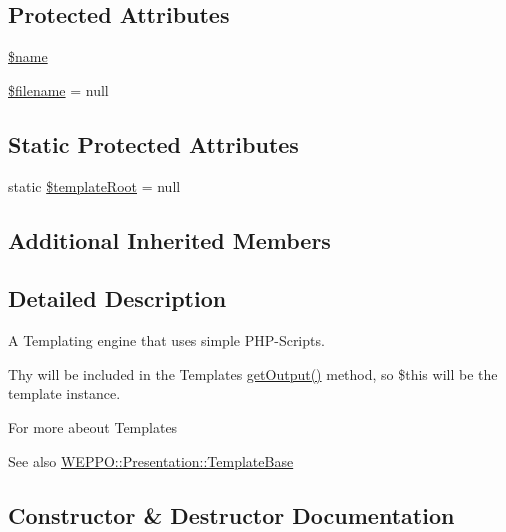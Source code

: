 \subsection*{Protected Attributes}
\begin{DoxyCompactItemize}
\item 
\hyperlink{classWEPPO_1_1Presentation_1_1PHPFileTemplate_a167680b0ee6c9bd8a67655ab9f65fa2a}{\$name}
\item 
\hyperlink{classWEPPO_1_1Presentation_1_1PHPFileTemplate_a2277c9a0683795bb748b30a55293c668}{\$filename} = null
\end{DoxyCompactItemize}
\subsection*{Static Protected Attributes}
\begin{DoxyCompactItemize}
\item 
static \hyperlink{classWEPPO_1_1Presentation_1_1PHPFileTemplate_a02b49f31783cc5edff15e260801a5a3b}{\$template\+Root} = null
\end{DoxyCompactItemize}
\subsection*{Additional Inherited Members}


\subsection{Detailed Description}
A Templating engine that uses simple P\+H\+P-\/\+Scripts.

Thy will be included in the Templates \hyperlink{classWEPPO_1_1Presentation_1_1PHPFileTemplate_a1449e358540d953e2b4e95d4b0f5e1a7}{get\+Output()} method, so \$this will be the template instance.

For more abeout Templates \begin{DoxySeeAlso}{See also}
\hyperlink{classWEPPO_1_1Presentation_1_1TemplateBase}{W\+E\+P\+P\+O\+::\+Presentation\+::\+Template\+Base} 
\end{DoxySeeAlso}


\subsection{Constructor \& Destructor Documentation}
